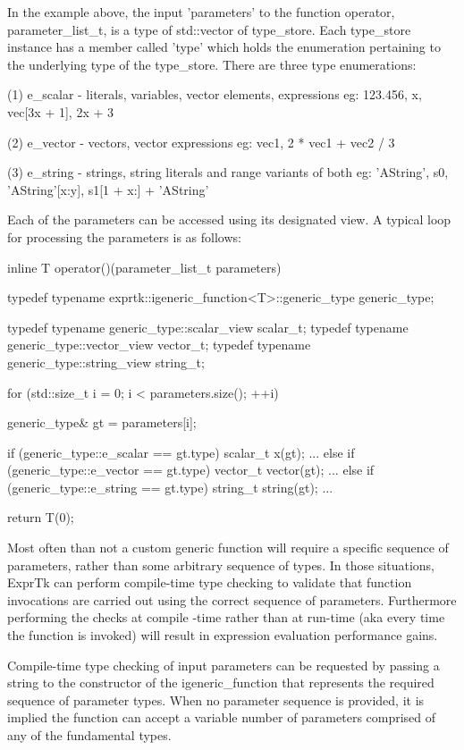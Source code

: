 In the example above, the input 'parameters' to the function operator,
parameter\_list\_t,  is  a  type  of  std::vector  of  type\_store.  Each
type\_store  instance  has  a  member  called  'type'  which  holds the
enumeration pertaining to the underlying type of the type\_store. There
are three type enumerations:

(1) e\_scalar - literals, variables, vector elements, expressions
eg: 123.456, x, vec[3x + 1], 2x + 3

(2) e\_vector - vectors, vector expressions
eg: vec1, 2 * vec1 + vec2 / 3

(3) e\_string - strings, string literals and range variants of both
eg: 'AString', s0, 'AString'[x:y], s1[1 + x:] + 'AString'


Each of the  parameters can be  accessed using its  designated view. A
typical loop for processing the parameters is as follows:

inline T operator()(parameter\_list\_t parameters)
{
typedef typename exprtk::igeneric\_function<T>::generic\_type
generic\_type;

typedef typename generic\_type::scalar\_view scalar\_t;
typedef typename generic\_type::vector\_view vector\_t;
typedef typename generic\_type::string\_view string\_t;

for (std::size\_t i = 0; i < parameters.size(); ++i)
{
	generic\_type\& gt = parameters[i];
	
	if (generic\_type::e\_scalar == gt.type)
	{
		scalar\_t x(gt);
		...
	}
	else if (generic\_type::e\_vector == gt.type)
	{
		vector\_t vector(gt);
		...
	}
	else if (generic\_type::e\_string == gt.type)
	{
		string\_t string(gt);
		...
	}
}

return T(0);
}


Most often than not a custom generic function will require a  specific
sequence of parameters, rather than some arbitrary sequence of  types.
In those situations, ExprTk can perform compile-time type checking  to
validate that function invocations  are carried out using  the correct
sequence of parameters. Furthermore  performing the checks at  compile
-time rather than at run-time (aka every time the function is invoked)
will result in expression evaluation performance gains.

Compile-time type  checking of  input parameters  can be  requested by
passing  a string  to the  constructor of  the igeneric\_function  that
represents the required sequence of parameter types. When no parameter
sequence is provided, it is implied the function can accept a variable
number of parameters comprised of any of the fundamental types.

